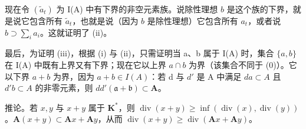 现在令 \((\tilde{a}_t)\) 为 I(A) 中有下界的非空元素族。说除性理想 \(b\) 是这个族的下界，就是说它包含所有 \(\tilde{a}_t\)，也就是说（因为 \(b\) 是除性理想）它包含所有 \(a_t\)，或者说 \(b \supset \sum_{i} a_i\)。这就证明了 (ii)。

最后，为证明 (iii)，根据 (i) 与 (ii)，只需证明当 a、b 属于 I(A) 时，集合 \(\{a, b\}\) 在 I(A) 中既有上界又有下界；现在它以上界 \(a \cap b\) 为界（该集合不同于 (0)）。它以下界 \(a + b\) 为界，因为 \(a + b \in I(A)\)：若 d 与 \(d'\) 是 A 中满足 \(da \subset A\) 且 \(d'b \subset A\) 的非零元素，则 \(dd'(\mathfrak{a} + \mathfrak{b}) \subset \mathbf{A}\)。

推论。若 \(x, y\) 与 \(x + y\) 属于 \(\mathbf{K}^*\)，则 \(\operatorname{div}(x + y) \geqslant \inf(\operatorname{div}(x), \operatorname{div}(y))\)。\(\mathbf{A}(x + y) \subset \mathbf{A}x + \mathbf{A}y\)，从而 \(\operatorname{div}(x + y) \geqslant \operatorname{div}(\mathbf{A}x + \mathbf{A}y)\)。
